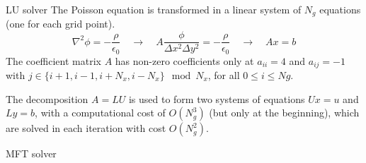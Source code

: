 \documentclass{beamer}
\newcommand{\backupend}{
   \setcounter{framenumber}{\value{finalframe}}
}
\begin{document}
\begin{frame}{LU solver}
The Poisson equation is transformed in a linear system of $N_g$ equations (one 
for each grid point).
\begin{equation}
\label{eq:eq-system}
\nabla^2 \phi = - \frac{\rho}{\epsilon_0}
\quad \rightarrow \quad
A\frac{\phi}{\Delta x ^2 \Delta y^2} = -\frac{\rho}{\epsilon_0}
\quad \rightarrow \quad
Ax = b
\end{equation}
The coefficient matrix $A$ has non-zero coefficients only at $a_{ii} = 4$ and 
$a_{ij} = -1$ with $j \in \{i+1, i-1, i+N_x, i-N_x\} \mod N_x$, for all $0 \le i 
\le Ng$.

\vspace{1em}
The decomposition $A = LU$ is used to form two systems of equations $Ux = u$ and 
$Ly=b$, with a computational cost of $O(N_g^3)$ (but only at the beginning), 
which are solved in each iteration with cost $O(N_g^2)$.
\end{frame}

\begin{frame}{MFT solver}
\begin{center}%
\end{center}%
\end{frame}

\backupend
\end{document}
